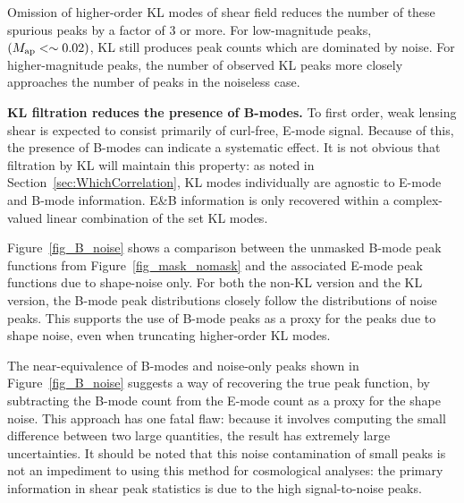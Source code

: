 Omission of higher-order KL modes of shear field reduces the number of
these spurious peaks by a factor of 3 or more.  For low-magnitude peaks,
$(M_{\rm ap}<\sim 0.02)$, KL still produces peak counts which are 
dominated by noise. For higher-magnitude peaks, the number of observed 
KL peaks more closely approaches the number of peaks in the noiseless case.

\textbf{KL filtration reduces the presence of B-modes.}
To first order, weak lensing shear is expected to consist primarily of
curl-free, E-mode signal.  Because of this, the presence of B-modes can
indicate a systematic effect.  It is not obvious that filtration by KL
will maintain this property: as noted in Section~\ref{sec:WhichCorrelation},
KL modes individually are agnostic to E-mode and B-mode information.  
E\&B information is only recovered within a 
complex-valued linear combination of the set KL modes.

Figure~\ref{fig_B_noise} shows a comparison between the unmasked
B-mode peak functions from Figure~\ref{fig_mask_nomask} and the associated
E-mode peak functions due to shape-noise only.  For both the non-KL version
and the KL version, the B-mode peak distributions closely follow the
distributions of noise peaks.  This supports the use of B-mode peaks as
a proxy for the peaks due to shape noise, even when truncating higher-order
KL modes.

The near-equivalence of B-modes and noise-only peaks shown in 
Figure~\ref{fig_B_noise} suggests a way of recovering the true peak function,
by subtracting the B-mode count from the E-mode count as a proxy for the 
shape noise. This approach has one fatal flaw: because it involves computing
the small difference between two large quantities, the result has
extremely large uncertainties.  It should be
noted that this noise contamination of small peaks is not an impediment to
using this method for cosmological analyses: the primary information
in shear peak statistics is due to the high signal-to-noise peaks.

